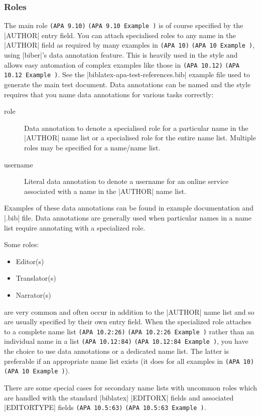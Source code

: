 \documentclass{ltxdockit}
\newcommand\apa[2][]{\ifthenelse{\equal{#1}{}}%
                       {\texttt{(APA #2)}}%
                       {\texttt{(APA #2 Example #1)}}}
\begin{document}
\subsubsection{Roles}
The main role \apa{9.10} is of course specified by the |AUTHOR| entry
field. You can attach specialised roles to any name in the |AUTHOR| field as
required by many examples in \apa{10}, using |biber|'s data annotation
feature. This is heavily used in the style and allows easy automation of
complex examples like those in \apa{10.12}. See the
|biblatex-apa-test-references.bib| example file used to generate the main
test document. Data annotations can be named and the style requires that
you name data annotations for various tasks correctly:

\begin{description}
  \item[role] Data annotation to denote a specialised role for a particular
    name in the |AUTHOR| name list or a specialised role for the entire
    name list. Multiple roles may be specified for a name/name list.
  \item[username] Literal data annotation to denote a username for an
    online service associated with a name in the |AUTHOR| name list.
\end{description}    
%
Examples of these data annotations can be found in example documentation
and |.bib| file. Data annotations are generally used when particular names
in a name list require annotating with a specialized role.

Some roles:

\begin{itemize}
  \item Editor(s)
  \item Translator(s)
  \item Narrator(s)
\end{itemize}
%
are very common and often occur in addition to the |AUTHOR| name list and
so are usually specified by their own entry field. When the specialized
role attaches to a complete name list \apa{10.2:26} rather than
an individual name in a list \apa{10.12:84}, you have the choice
to use data annotations or a dedicated name list. The latter is preferable
if an appropriate name list exists (it does for all examples in \apa{10}).

There are some special cases for secondary name lists with uncommon roles
which are handled with the standard |biblatex| |EDITORX| fields and
associated |EDITORTYPE| fields \apa{10.5:63}.
\end{document}
